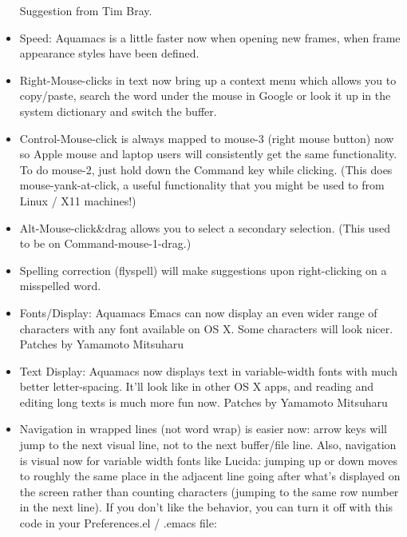 \begin{itemize}
        Suggestion from Tim Bray.

\item Speed: Aquamacs is a little faster now when opening new frames,
        when frame appearance styles have been defined.

\item Right-Mouse-clicks in text now bring up a context menu which
        allows you to copy/paste, search the word under the mouse in
        Google or look it up in the system dictionary and switch the buffer.

\item Control-Mouse-click is always mapped to mouse-3 (right mouse
        button) now so Apple mouse and laptop users will consistently get the same
        functionality. To do mouse-2, just hold down the Command key while
        clicking. (This does mouse-yank-at-click, a useful functionality that you
        might be used to from Linux / X11 machines!)

\item Alt-Mouse-click\&drag allows you to select a secondary
        selection. (This used to be on Command-mouse-1-drag.)

\item Spelling correction (flyspell) will make suggestions upon
        right-clicking on a misspelled word.

\item Fonts/Display: Aquamacs Emacs can now display an even wider
        range of characters with any font available on OS X. Some
        characters will look nicer.
        Patches by Yamamoto Mitsuharu

\item Text Display: Aquamacs now displays text in variable-width fonts
        with much better letter-spacing. It'll look like in other OS X
        apps, and reading and editing long texts is much more fun now.
        Patches by Yamamoto Mitsuharu

\item Navigation in wrapped lines (not word wrap) is easier now: arrow
        keys will jump to the next visual line, not to the next
        buffer/file line. Also, navigation is visual now for variable
        width fonts like Lucida: jumping up or down moves to roughly the
        same place in the adjacent line going after what's displayed on
        the screen rather than counting characters (jumping to the same
        row number in the next line).  If you don't like the behavior, you
        can turn it off with this code in your Preferences.el / .emacs
        file:


\end{itemize}
